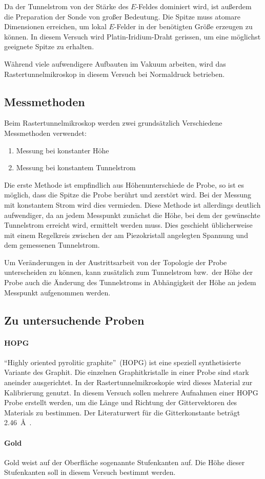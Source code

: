 Da der Tunnelstrom von der Stärke des $E$-Feldes dominiert wird,
ist außerdem die Preparation der Sonde von großer Bedeutung.
Die Spitze muss atomare Dimensionen erreichen, um lokal $E$-Felder in der benötigten Größe erzeugen zu können.
In diesem Versuch wird Platin-Iridium-Draht gerissen, um eine möglichst geeignete Spitze zu erhalten.

Während viele aufwendigere Aufbauten im Vakuum arbeiten, wird das Rastertunnelmikroskop in diesem Versuch bei Normaldruck betrieben.

\subsection{Messmethoden}

Beim Rastertunnelmikroskop werden zwei grundsätzlich Verschiedene Messmethoden verwendet:
\begin{enumerate}
  \item Messung bei konstanter Höhe
  \item Messung bei konstantem Tunnelstrom
\end{enumerate}

Die erste Methode ist empfindlich aus Höhenunterschiede de Probe, so ist es möglich, dass die Spitze die Probe berührt und zerstört wird.
Bei der Messung mit konstantem Strom wird dies vermieden. 
Diese Methode ist allerdings deutlich aufwendiger, da an jedem Messpunkt zunächst die Höhe, bei dem der gewünschte Tunnelstrom erreicht wird, ermittelt werden muss.
Dies geschieht üblicherweise mit einem Regelkreis zwischen der am Piezokristall angelegten Spannung und dem gemessenen Tunnelstrom.

Um Veränderungen in der Austrittsarbeit von der Topologie der Probe unterscheiden zu können, kann zusätzlich zum Tunnelstrom bzw.\ der Höhe der Probe auch die Änderung des Tunnelstroms in Abhängigkeit der Höhe an jedem Messpunkt aufgenommen werden.

\subsection{Zu untersuchende Proben}

\paragraph{HOPG} 
\enquote{Highly oriented pyrolitic graphite}~(HOPG) ist eine speziell synthetisierte Variante des Graphit.
Die einzelnen Graphitkristalle in einer Probe sind stark aneinder ausgerichtet.
In der Rastertunnelmikroskopie wird dieses Material zur Kalibrierung genutzt.
In diesem Versuch sollen mehrere Aufnahmen einer HOPG Probe erstellt werden, 
um die Länge und Richtung der Gittervektoren des Materials zu bestimmen.
Der Literaturwert für die Gitterkonstante beträgt \SI{2.46}{\angstrom}~\cite{stm1}.

\paragraph{Gold}
Gold weist auf der Oberfläche sogenannte Stufenkanten auf. Die Höhe dieser Stufenkanten soll in diesem Versuch bestimmt werden.
